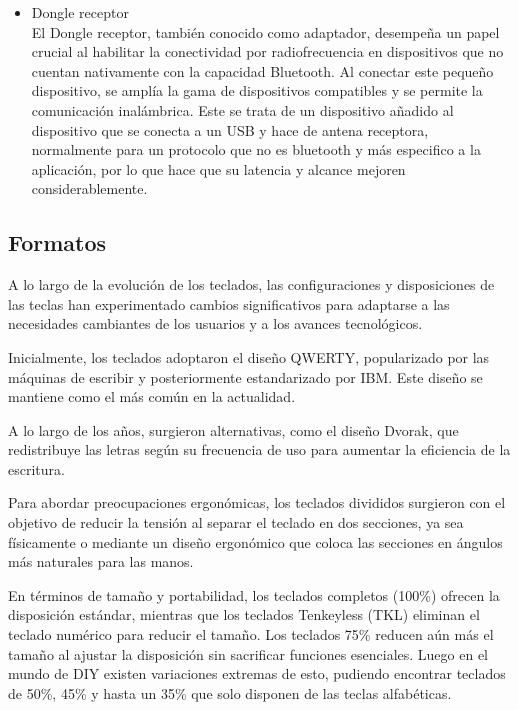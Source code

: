 \begin{itemize}
\begin{itemize}
        \item \gls{Dongle} receptor \\
            El \gls{Dongle} receptor, también conocido como adaptador, desempeña un papel crucial al habilitar la conectividad por radiofrecuencia en dispositivos que no cuentan nativamente con la capacidad \gls{Bluetooth}. Al conectar este pequeño dispositivo, se amplía la gama de dispositivos compatibles y se permite la comunicación inalámbrica. Este se trata de un dispositivo añadido al dispositivo que se conecta a un \gls{USB} y hace de antena receptora, normalmente para un protocolo que no es bluetooth y más especifico a la aplicación, por lo que hace que su latencia y alcance mejoren considerablemente.
    \end{itemize}
\end{itemize}

\subsection{Formatos}

A lo largo de la evolución de los teclados, las configuraciones y disposiciones de las teclas han experimentado cambios significativos para adaptarse a las necesidades cambiantes de los usuarios y a los avances tecnológicos.

Inicialmente, los teclados adoptaron el diseño \gls{QWERTY}, popularizado por las máquinas de escribir y posteriormente estandarizado por IBM. Este diseño se mantiene como el más común en la actualidad.

A lo largo de los años, surgieron alternativas, como el diseño Dvorak, que redistribuye las letras según su frecuencia de uso para aumentar la eficiencia de la escritura.

Para abordar preocupaciones ergonómicas, los teclados divididos surgieron con el objetivo de reducir la tensión al separar el teclado en dos secciones, ya sea físicamente o mediante un diseño ergonómico que coloca las secciones en ángulos más naturales para las manos.

En términos de tamaño y portabilidad, los teclados completos (100\%) ofrecen la disposición estándar, mientras que los teclados Tenkeyless (TKL) eliminan el teclado numérico para reducir el tamaño. Los teclados 75\% reducen aún más el tamaño al ajustar la disposición sin sacrificar funciones esenciales. Luego en el mundo de \gls{DIY} existen variaciones extremas de esto, pudiendo encontrar teclados de 50\%, 45\% y hasta un 35\% que solo disponen de las teclas alfabéticas.

